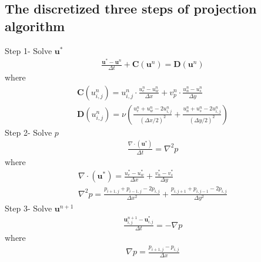 \documentclass[11pt,dvips]{article}
\numberwithin{equation}{section}
\begin{document}
\subsection{The discretized three steps of projection algorithm}
Step 1- Solve $\mathbf{u}^{*}$
\begin{align*}
\frac{\mathbf{u}^{*}-\mathbf{u}^{n}}{\Delta t}+\mathbf{C}(\mathbf{u}^{n})=\mathbf{D}(\mathbf{u}^{{n}}) 
\tag{6a}
\end{align*}
where
\begin{align*}
\mathbf{C}(u^n_{i,j})=u^n_{i,j} \cdot \frac{u^n_{e}-u^n_{w}}{\Delta x}+v^n_{p} \cdot \frac{u^n_{n}-u^n_{s}}{\Delta y} \\
\mathbf{D}(u^n_{i,j})=\nu (\frac{u^n_{e}+ u^n_{w}-2u^n_{i,j}}{(\Delta x/2)^2}+\frac{u^n_{n}+ u^n_{s}-2u^n_{i,j}}{(\Delta y/2)^2})
\end{align*}
Step 2- Solve $p$
\begin{align*}
\frac{\nabla \cdot(\mathbf{u}^{*})}{\Delta t}=\nabla ^2 p
\tag{9}
\end{align*}
where
\begin{align*}
\nabla \cdot(\mathbf{u}^{*})=\frac{u^{*}_{e}-u^{*}_{w}}{\Delta x}+\frac{v^{*}_{n}-v^{*}_{s}}{\Delta y} \\
\nabla ^2 p=\frac{p_{i+1,j}+p_{i-1,j}-2p_{i,j}}{\Delta x^2}+\frac{p_{i,j+1}+p_{i,j-1}-2p_{i,j}}{\Delta y^2}
\end{align*}
Step 3- Solve $\mathbf{u}^{n+1}$
\begin{align*}
\frac{\mathbf{u}^{n+1}_{i,j}-\mathbf{u}^{*}_{i,j}}{\Delta t}=-\nabla p
\tag{6b}
\end{align*}
where
\begin{align*}
\nabla p=\frac{p_{i+1,j}-p_{i,j}}{\Delta x}
\end{align*}

\clearpage


\end{document}
